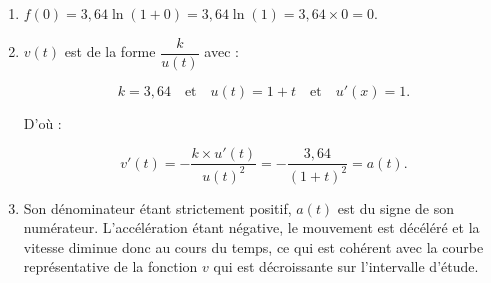\begin{enumerate}[start=5]
\item $f(0) = 3,64\ln(1 + 0) = 3,64\ln(1) = 3,64 \times 0 = 0$.

\item $v(t)$ est de la forme $\dfrac{k}{u(t)}$ avec :

\[k = 3,64 \quad \text{et} \quad u(t) = 1 + t \quad \text{et} \quad u'(x) = 1.\]

D'où :

\[v'(t) = -\dfrac{k \times u'(t)}{u(t)^2} = - \dfrac{3,64}{(1 + t)^2} = a(t).\]

\item Son dénominateur étant strictement positif, $a(t)$ est du signe de son numérateur. L'accélération étant négative, le mouvement est décéléré et la vitesse diminue donc au cours du temps, ce qui est cohérent avec la courbe représentative de la fonction $v$ qui est décroissante sur l'intervalle d'étude.
\end{enumerate}

\bigskip
